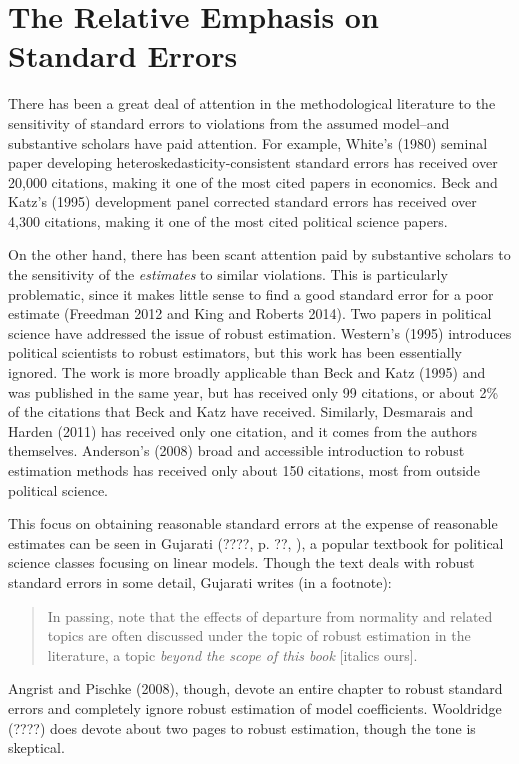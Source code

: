\documentclass[12pt]{article}
\begin{document}

\section*{The Relative Emphasis on Standard Errors}

There has been a great deal of attention in the methodological literature to the sensitivity of standard errors to violations from the assumed model--and substantive scholars have paid attention. For example, White's (1980) seminal paper developing heteroskedasticity-consistent standard errors has received over 20,000 citations, making it one of the most cited papers in economics. Beck and Katz's (1995) development panel corrected standard errors has received over 4,300 citations, making it one of the most cited political science papers.

On the other hand, there has been scant attention paid by substantive scholars to the sensitivity of the \textit{estimates} to similar violations. This is particularly problematic, since it makes little sense to find a good standard error for a poor estimate (Freedman 2012 and King and Roberts 2014). Two papers in political science have addressed the issue of robust estimation. Western's (1995) introduces political scientists to robust estimators, but this work has been essentially ignored. The work is more broadly applicable than Beck and Katz (1995) and was published in the same year, but has received only 99 citations, or  about 2\% of the citations that Beck and Katz have received. Similarly, Desmarais and Harden (2011) has received only one citation, and it comes from the authors themselves. Anderson's (2008) broad and accessible introduction to robust estimation methods has received only about 150 citations, most from outside political science.

This focus on obtaining reasonable standard errors at the expense of reasonable estimates can be seen in Gujarati (????, p. ??, ), a popular textbook for political science classes focusing on linear models. Though the text deals with robust standard errors in some detail, Gujarati writes (in a footnote):
\begin{quote}
In passing, note that the effects of departure from normality and related topics are often discussed under the topic of robust estimation in the literature, a topic \textit{beyond the scope of this book} [italics ours].
\end{quote}
Angrist and Pischke (2008), though, devote an entire chapter to robust standard errors and completely ignore robust estimation of model coefficients. Wooldridge (????) does devote about two pages to robust estimation, though the tone is skeptical.
\end{document}
